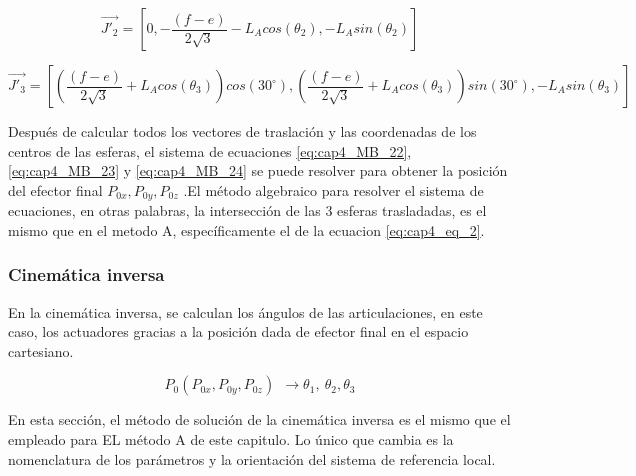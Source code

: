         \begin{equation}
                \overrightarrow{J'_{2}}= \left [  0,-\frac{(f-e)}{2\sqrt{3}}-L_{A}cos(\theta_2),-L_{A}sin(\theta_2)\right]
        \label{eq:cap4_MB_4}
        \end{equation}    
        
        \begin{equation}
                \overrightarrow{J'_{3}}= \left [\left( \frac{(f-e)}{2\sqrt{3}}+{L}_{A}cos(\theta_3)\right) cos(30^\circ), \left(\frac{(f-e)}{2\sqrt{3}} + {L}_{A}cos(\theta_3)\right) sin(30^\circ), -L_{A}sin(\theta_3)\right]
        \label{eq:cap4_MB_5}
        \end{equation}    
  
      Después de calcular todos los vectores de traslación y las coordenadas de los centros de las esferas, el sistema de ecuaciones  \ref{eq:cap4_MB_22}, \ref{eq:cap4_MB_23} y \ref{eq:cap4_MB_24} se puede resolver para obtener la posición del efector final \( P_{0x},P_{0y},P_{0z} \) .El método algebraico para resolver el sistema de ecuaciones, en otras palabras, la intersección de las 3 esferas trasladadas, es el mismo que en el metodo A, específicamente el de la ecuacion \ref{eq:cap4_eq_2}.
  
 \newpage
        
        

\subsubsection{Cinemática inversa}\label{mb_ci}

      En la cinemática inversa, se calculan los ángulos de las articulaciones, en este caso, los actuadores gracias a la posición dada de efector final en el espacio cartesiano. 
      
        \begin{equation}
              P_{0} \left( P_{0x},P_{0y},P_{0z} \right) ~~ \rightarrow    \theta _{1},~ \theta _{2}, \theta _{3} 
        \label{eq:cap4_MB_6}
        \end{equation}\par      
      
     En esta sección, el método de solución de la cinemática inversa es el mismo que el empleado para EL método A de este capitulo. Lo único que cambia es la nomenclatura de los parámetros y la orientación del sistema de referencia local.
  
